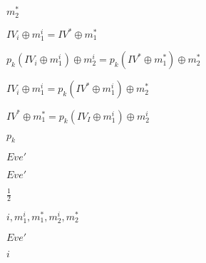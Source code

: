 \documentclass[10pt]{book}
\begin{document}
\begin{mdSnippets}
\begin{mdInlineSnippet}[024f1d5276f895b924b71cc42707652e]%
$m_2^*$\end{mdInlineSnippet}%
\begin{mdInlineSnippet}%
$IV_i \oplus m^i_1 = IV^* \oplus m_1^*$\end{mdInlineSnippet}%
\begin{mdInlineSnippet}%
$p_k(IV_i \oplus m^i_1) \oplus m^i_2 = p_k(IV^* \oplus m_1^*) \oplus m_2^*$\end{mdInlineSnippet}%
\begin{mdInlineSnippet}%
$IV_i \oplus m^i_1 = p_k(IV^* \oplus m^i_1) \oplus m_2^*$\end{mdInlineSnippet}%
\begin{mdInlineSnippet}[0bb63865a364adc8a439444fa1b7fc4f]%
$IV^* \oplus m_1^* = p_k(IV_I \oplus m^i_1) \oplus m^i_2$\end{mdInlineSnippet}%
\begin{mdInlineSnippet}%
$p_k$\end{mdInlineSnippet}%
\begin{mdInlineSnippet}[0c3570ae86ed9d695d5d1d469a0b8bfa]%
$Eve'$\end{mdInlineSnippet}%
\begin{mdInlineSnippet}[0c3570ae86ed9d695d5d1d469a0b8bfa]%
$Eve'$\end{mdInlineSnippet}%
\begin{mdInlineSnippet}[93b05c90d14a117ba52da1d743a43ab1]%
$\frac{1}{2}$\end{mdInlineSnippet}%
\begin{mdInlineSnippet}[f25d63f320440fa7e0c1507f1124e1e4]%
$i,m^i_1,m_1^*,m^i_2,m_2^*$\end{mdInlineSnippet}%
\begin{mdInlineSnippet}[0c3570ae86ed9d695d5d1d469a0b8bfa]%
$Eve'$\end{mdInlineSnippet}%
\begin{mdInlineSnippet}[865c0c0b4ab0e063e5caa3387c1a8741]%
$i$\end{mdInlineSnippet}%
\begin{mdInlineSnippet}%

\end{mdInlineSnippet}
\end{mdSnippets}
\end{document}
